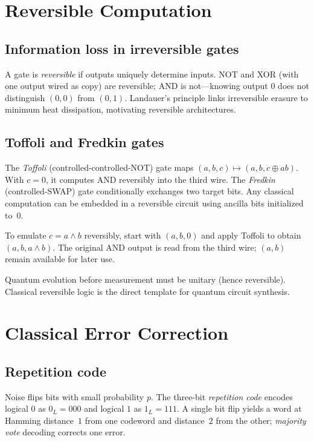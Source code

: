 \section{Reversible Computation}
\label{sec:reversible}

\subsection{Information loss in irreversible gates}

A gate is \emph{reversible} if outputs uniquely determine inputs. NOT and XOR (with one output wired as copy) are reversible; AND is not---knowing output $0$ does not distinguish $(0,0)$ from $(0,1)$. Landauer's principle links irreversible erasure to minimum heat dissipation, motivating reversible architectures.

\subsection{Toffoli and Fredkin gates}

The \emph{Toffoli} (controlled-controlled-NOT) gate maps $(a,b,c)\mapsto(a,b,c\oplus ab)$. With $c=0$, it computes AND reversibly into the third wire. The \emph{Fredkin} (controlled-SWAP) gate conditionally exchanges two target bits. Any classical computation can be embedded in a reversible circuit using ancilla bits initialized to~$0$.

\begin{example}
To emulate $c = a\land b$ reversibly, start with $(a,b,0)$ and apply Toffoli to obtain $(a,b,a\land b)$. The original AND output is read from the third wire; $(a,b)$ remain available for later use.
\end{example}

Quantum evolution before measurement must be unitary (hence reversible). Classical reversible logic is the direct template for quantum circuit synthesis.

\section{Classical Error Correction}
\label{sec:classical-ecc}

\subsection{Repetition code}

Noise flips bits with small probability $p$. The three-bit \emph{repetition code} encodes logical $0$ as $0_L=000$ and logical $1$ as $1_L=111$. A single bit flip yields a word at Hamming distance~$1$ from one codeword and distance~$2$ from the other; \emph{majority vote} decoding corrects one error.

